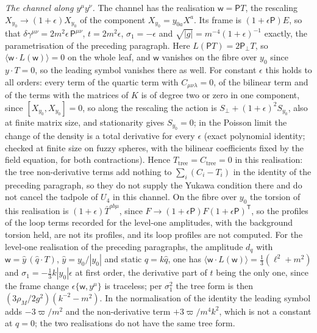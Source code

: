 \emph{The channel along \(y^\mu y^\nu\).} The channel has the realisation \(\mathsf w=\mathsf PT\), the rescaling \(X_{y_0}\to(1+\epsilon)X_{y_0}\) of the component \(X_{y_0}=y_{0a}X^a\). Its frame is \((1+\epsilon\mathsf P)E\), so that \(\delta\gamma^{\mu\nu}=2m^2\epsilon\,\mathsf P^{\mu\nu}\), \(t=2m^2\epsilon\), \(\sigma_1=-\epsilon\) and \(\sqrt{|g|}=m^{-4}(1+\epsilon)^{-1}\) exactly, the parametrisation of the preceding paragraph. Here \(L(\mathsf PT)=2\mathsf P_\perp T\), so \(\langle\mathsf w\cdot L(\mathsf w)\rangle=0\) on the whole leaf, and \(\mathsf w\) vanishes on the fibre over \(y_0\) since \(y\cdot T=0\), so the leading symbol vanishes there as well. For constant \(\epsilon\) this holds to all orders: every term of the quartic term with \(C_{\mu\nu\lambda}=0\), of the bilinear term and of the terms with the matrices of \(K\) is of degree two or zero in one component, since \([X_{y_0},X_{y_0}]=0\), so along the rescaling the action is \(S_\perp+(1+\epsilon)^2S_{y_0}\), also at finite matrix size, and stationarity gives \(S_{y_0}=0\); in the Poisson limit the change of the density is a total derivative for every \(\epsilon\) (exact polynomial identity; checked at finite size on fuzzy spheres, with the bilinear coefficients fixed by the field equation, for both contractions). Hence \(T_{\mathrm{tree}}=C_{\mathrm{tree}}=0\) in this realisation: the tree non-derivative terms add nothing to \(\sum_i(C_i-T_i)\) in the identity of the preceding paragraph, so they do not supply the Yukawa condition there and do not cancel the tadpole of \(U_4\) in this channel. On the fibre over \(y_0\) the torsion of this realisation is \((1+\epsilon)\bar T^{ab\mu}\), since \(F\to(1+\epsilon\mathsf P)F(1+\epsilon\mathsf P)^{\mathsf T}\), so the profiles of the loop terms recorded for the level-one amplitudes, with the background torsion held, are not its profiles, and its loop profiles are not computed. For the level-one realisation of the preceding paragraphs, the amplitude \(d_q\) with \(\mathsf w=\hat y\,(\hat q\cdot T)\), \(\hat y=y_0/|y_0|\) and static \(q=k\hat q\), one has \(\langle\mathsf w\cdot L(\mathsf w)\rangle=\tfrac13(\ell^2+m^2)\) and \(\sigma_1=-\tfrac13k|y_0|\epsilon\) at first order, the derivative part of \(t\) being the only one, since the frame change \(\epsilon\{\mathsf w,y^\mu\}\) is traceless; per \(\sigma_1^2\) the tree form is then \((3\rho_M/2g^2)(k^{-2}-m^2)\). In the normalisation of the identity the leading symbol adds \(-3\varpi/m^2\) and the non-derivative term \(+3\varpi/m^4k^2\), which is not a constant at \(q=0\); the two realisations do not have the same tree form.


